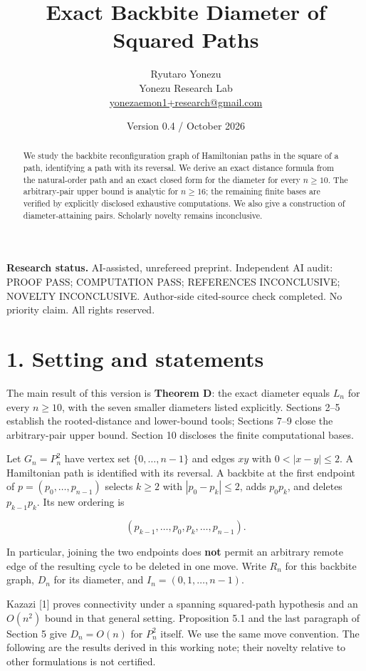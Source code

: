 \documentclass[11pt,a4paper]{article}
\title{\LARGE\bfseries Exact Backbite Diameter of Squared Paths}
\author{Ryutaro Yonezu\\[2pt]\normalsize Yonezu Research Lab\\
\small\href{mailto:yonezaemon1+research@gmail.com}{yonezaemon1+research@gmail.com}}
\date{Version 0.4 \enspace / \enspace 22 October 2026}
\begin{document}
\maketitle
\thispagestyle{plain}
\begin{abstract}
We study the backbite reconfiguration graph of Hamiltonian paths in the
square of a path, identifying a path with its reversal. We derive an exact
distance formula from the natural-order path and an exact closed form for
the diameter for every $n\ge10$. The arbitrary-pair upper bound is analytic
for $n\ge16$; the remaining finite bases are verified by explicitly
disclosed exhaustive computations. We also give a construction of
diameter-attaining pairs. Scholarly novelty remains inconclusive.
\end{abstract}
{\small\textbf{Research status.} AI-assisted, unrefereed preprint.
Independent AI audit: PROOF PASS; COMPUTATION PASS;
REFERENCES INCONCLUSIVE; NOVELTY INCONCLUSIVE.
Author-side cited-source check completed. No priority claim. All rights reserved.}
\medskip
\hypertarget{setting-and-statements}{%
\section{1. Setting and statements}\label{setting-and-statements}}

The main result of this version is \textbf{Theorem D}: the exact diameter equals \(L_n\) for every \(n\ge10\), with the seven smaller diameters listed explicitly. Sections 2--5 establish the rooted-distance and lower-bound tools; Sections 7--9 close the arbitrary-pair upper bound. Section 10 discloses the finite computational bases.

Let \(G_n=P_n^2\) have vertex set \(\{0,\ldots,n-1\}\) and edges \(xy\) with \(0<|x-y|\le2\). A Hamiltonian path is identified with its reversal. A backbite at the first endpoint of \(p=(p_0,\ldots,p_{n-1})\) selects \(k\ge2\) with \(|p_0-p_k|\le2\), adds \(p_0p_k\), and deletes \(p_{k-1}p_k\). Its new ordering is

\[ (p_{k-1},\ldots,p_0,p_k,\ldots,p_{n-1}). \]

In particular, joining the two endpoints does \textbf{not} permit an arbitrary remote edge of the resulting cycle to be deleted in one move. Write \(R_n\) for this backbite graph, \(D_n\) for its diameter, and \(I_n=(0,1,\ldots,n-1)\).

Kazazi {[}1{]} proves connectivity under a spanning squared-path hypothesis and an \(O(n^2)\) bound in that general setting. Proposition 5.1 and the last paragraph of Section 5 give \(D_n=O(n)\) for \(P_n^2\) itself. We use the same move convention. The following are the results derived in this working note; their novelty relative to other formulations is not certified.
\end{document}
